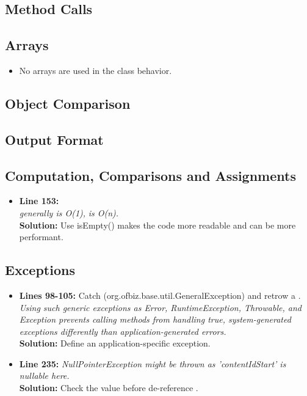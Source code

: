 \subsection{Method Calls}

\subsection{Arrays}
\begin{itemize}
	\item No arrays are used in the class behavior.
\end{itemize}

\subsection{Object Comparison}

\subsection{Output Format}

\subsection{Computation, Comparisons and Assignments}
\begin{itemize}
	\item \textbf{Line 153:}\\
\textit{ generally is O(1),}  \textit{is O(n).}\\
	\textbf{Solution:}	Use isEmpty() makes the code more readable and can be more performant. \\
	 
\end{itemize}

\subsection{Exceptions}
\begin{itemize}
\item \textbf{Lines 98-105:}
Catch  (org.ofbiz.base.util.GeneralException) and retrow a .\\
\textit{Using such generic exceptions as Error, RuntimeException, Throwable, and Exception prevents calling methods from handling true, system-generated exceptions differently than application-generated errors.}\\
\textbf{Solution:} Define an application-specific exception.

\item \textbf{Line 235:} 
\textit{NullPointerException might be thrown as 'contentIdStart' is nullable here.}\\
\textbf{Solution: }Check the  value before de-reference .
\end{itemize}

